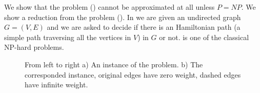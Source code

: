 We show that the \ProblemPath{} problem (\ProbPath{}) cannot be approximated at all
unless $P = NP$.
We show a reduction from the \ProblemHam{} problem (\ProbHam{}).
In \ProbHam{} we are given an undirected graph $G = (V, E)$ and we are 
asked to decide if there is an Hamiltonian path 
(a simple path traversing all the vertices in $V$) in $G$ or not.
\ProbHam{} is one of the classical NP-hard problems.

\begin{figure}
\begin{center}

\end{center}
\caption{\label{fig-hamiltonian}
From left to right
a) An instance of the \ProblemHam{} problem.
b) The corresponded \ProblemPath{} instance, 
original edges have zero weight, dashed edges have infinite weight.
}
\end{figure} 
